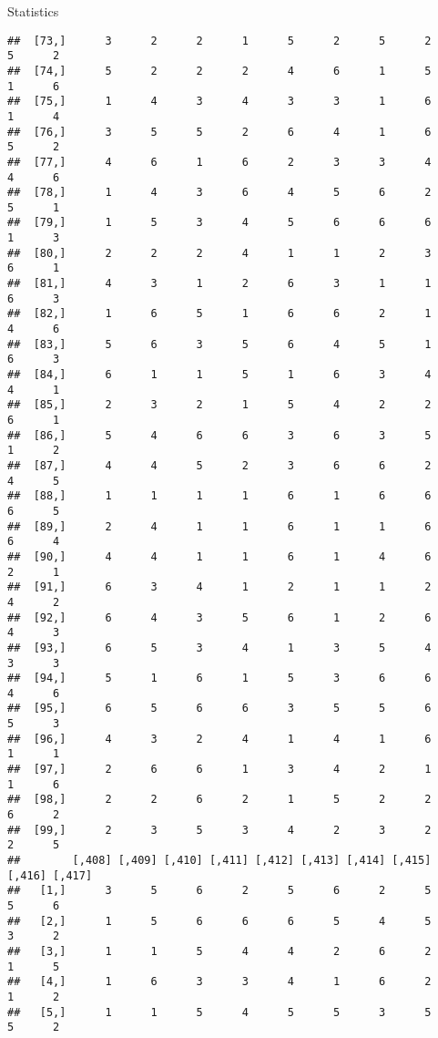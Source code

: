 \documentclass[
  ignorenonframetext,
]{beamer}
\begin{document}
\begin{frame}[fragile]{Statistics}
\begin{verbatim}
##  [73,]      3      2      2      1      5      2      5      2      5      2
##  [74,]      5      2      2      2      4      6      1      5      1      6
##  [75,]      1      4      3      4      3      3      1      6      1      4
##  [76,]      3      5      5      2      6      4      1      6      5      2
##  [77,]      4      6      1      6      2      3      3      4      4      6
##  [78,]      1      4      3      6      4      5      6      2      5      1
##  [79,]      1      5      3      4      5      6      6      6      1      3
##  [80,]      2      2      2      4      1      1      2      3      6      1
##  [81,]      4      3      1      2      6      3      1      1      6      3
##  [82,]      1      6      5      1      6      6      2      1      4      6
##  [83,]      5      6      3      5      6      4      5      1      6      3
##  [84,]      6      1      1      5      1      6      3      4      4      1
##  [85,]      2      3      2      1      5      4      2      2      6      1
##  [86,]      5      4      6      6      3      6      3      5      1      2
##  [87,]      4      4      5      2      3      6      6      2      4      5
##  [88,]      1      1      1      1      6      1      6      6      6      5
##  [89,]      2      4      1      1      6      1      1      6      6      4
##  [90,]      4      4      1      1      6      1      4      6      2      1
##  [91,]      6      3      4      1      2      1      1      2      4      2
##  [92,]      6      4      3      5      6      1      2      6      4      3
##  [93,]      6      5      3      4      1      3      5      4      3      3
##  [94,]      5      1      6      1      5      3      6      6      4      6
##  [95,]      6      5      6      6      3      5      5      6      5      3
##  [96,]      4      3      2      4      1      4      1      6      1      1
##  [97,]      2      6      6      1      3      4      2      1      1      6
##  [98,]      2      2      6      2      1      5      2      2      6      2
##  [99,]      2      3      5      3      4      2      3      2      2      5
##        [,408] [,409] [,410] [,411] [,412] [,413] [,414] [,415] [,416] [,417]
##   [1,]      3      5      6      2      5      6      2      5      5      6
##   [2,]      1      5      6      6      6      5      4      5      3      2
##   [3,]      1      1      5      4      4      2      6      2      1      5
##   [4,]      1      6      3      3      4      1      6      2      1      2
##   [5,]      1      1      5      4      5      5      3      5      5      2

\end{verbatim}
\end{frame}
\end{document}
